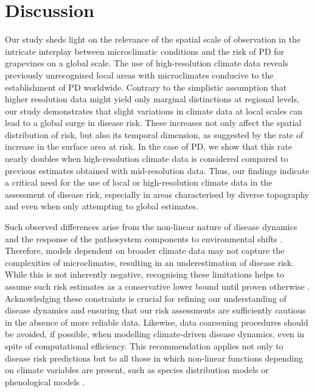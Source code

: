 \section{Discussion}

Our study sheds light on the  relevance of the spatial scale of observation
in the intricate interplay between microclimatic conditions and the risk of PD
for grapevines on a global scale. The use of high-resolution climate data
reveals previously unrecognised local areas with microclimates conducive to the
establishment of PD worldwide. Contrary to the simplistic assumption that
higher resolution data might yield only marginal distinctions at regional
levels, our study demonstrates that slight variations in climate data at local
scales can lead to a global surge in disease risk. These increases  not only
affect the spatial distribution of risk, but also its temporal dimension, as
suggested by the rate of increase in the surface area at risk. In the case of
PD, we show that this rate nearly doubles when high-resolution climate data is
considered compared to previous estimates obtained with mid-resolution data.
Thus, our findings indicate a critical need for the use of local or
high-resolution climate data in the assessment of disease risk, especially in
areas characterised by diverse topography and even when only attempting to
global estimates.

Such observed differences arise from the non-linear nature of disease
dynamics and the response of the pathosystem components to environmental shifts
\cite{scherm1994global,Dudney2021}. Therefore, models dependent on broader
climate data may not capture the complexities of microclimates, resulting in an
underestimation of disease risk.  While this is not inherently negative,
recognising these limitations helps to assume such risk estimates as a
conservative lower bound until proven otherwise . Acknowledging these
constraints is crucial for refining our understanding of disease dynamics and
ensuring that our risk assessments are sufficiently cautious in the absence of
more reliable data. Likewise, data coarsening procedures should be avoided, if
possible, when modelling climate-driven disease dynamics, even in spite of
computational efficiency. This recommendation applies not only to disease risk
predictions but to all those in which non-linear functions depending on climate
variables are present, such as species distribution models or phenological
models \cite{menzel2006european}.

